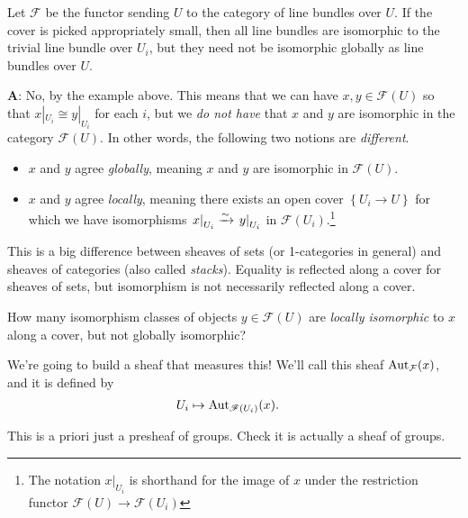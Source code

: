 \documentclass[11pt,openany]{book}
\begin{document}
\begin{example} Let $\mathcal{F}$ be the functor sending $U$ to the category of line bundles over $U$. If the cover is picked appropriately small, then all line bundles are isomorphic to the trivial line bundle over $U_i$, but they need not be isomorphic globally as line bundles over $U$.
\end{example}

\textbf{A}: No, by the example above. This means that we can have $x,y \in \mathcal{F}(U)$ so that $x|_{U_i} \cong y|_{U_i}$ for each $i$, but we \textit{do not have} that $x$ and $y$ are isomorphic in the category $\mathcal{F}(U)$. In other words, the following two notions are \textit{different}.
\begin{itemize}
    \item $x$ and $y$ agree \textit{globally}, meaning $x$ and $y$ are isomorphic in $\mathscr{F}(U)$.
    \item  $x$ and $y$ agree \textit{locally}, meaning there exists an open cover $\left\{ U_i \to U \right\}$ for which we have isomorphisms $\left. x \right|_{ U_i } \xrightarrow{\sim} \left. y \right|_{ U_i }$ in $\mathcal{F}(U_i)$.\footnote{%
    The notation $x|_{U_i}$ is shorthand for the image of $x$ under the restriction functor $\mathcal{F}(U) \to \mathcal{F}(U_i)$
    }
\end{itemize}


\begin{remark} This is a big difference between sheaves of sets (or 1-categories in general) and sheaves of categories (also called \textit{stacks}). Equality is reflected along a cover for sheaves of sets, but isomorphism is not necessarily reflected along a cover.
\end{remark}

\begin{question} How many isomorphism classes of objects $y\in \mathcal{F}(U)$ are \textit{locally isomorphic} to $x$ along a cover, but not globally isomorphic?
\end{question}

We're going to build a sheaf that measures this! We'll call this sheaf $\mathrm{Aut}_{\mathcal{F}}(x)$, and it is defined by
\begin{equation}\label{eqn:autx-torsor}
\begin{aligned}
    U_i &\mapsto \mathrm{Aut}_{\mathscr{F}(U_i)}(x).
\end{aligned}
\end{equation}
\begin{exercise} This is a priori just a presheaf of groups. Check it is actually a sheaf of groups.
\end{exercise}
\end{document}
